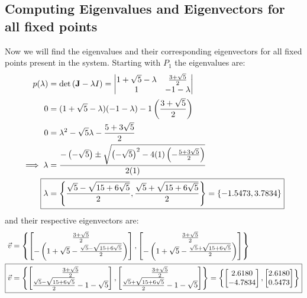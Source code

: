 \subsection{Computing Eigenvalues and Eigenvectors for all fixed points}\label{subsec:computing-eigenvalues-and-eigenvectors-for-all-fixed-points}
Now we will find the eigenvalues and their corresponding eigenvectors for all fixed points present in the system. Starting with $P_1$ the eigenvalues are:
\begin{align*}
    p(\lambda) &= \det\left(\textbf{J}-\lambda I\right) = \begin{vmatrix}
        1+\sqrt{5}-\lambda & \frac{3+\sqrt{5}}{2}\\
        1 & -1-\lambda
    \end{vmatrix}\\
    0 &= (1+\sqrt{5}-\lambda)(-1-\lambda)-1\left(\frac{3+\sqrt{5}}{2}\right)\\
    0 &= \lambda^2-\sqrt{5}\lambda - \frac{5+3\sqrt{5}}{2}\\
    \implies \lambda &= \frac{-\left(-\sqrt{5}\right) \pm \sqrt{\left(-\sqrt{5}\right)^2-4(1)\left(-\frac{5+3\sqrt{5}}{2}\right)}}{2(1)}\\
    \Aboxed{\lambda &= \left\{\frac{\sqrt{5} - \sqrt{15+6\sqrt{5}}}{2}, \frac{\sqrt{5} + \sqrt{15+6\sqrt{5}}}{2}\right\} = \{-1.5473, 3.7834\}}
\end{align*}
and their respective eigenvectors are:
\begin{align*}
    \vec{v} &= \left\{\begin{bmatrix}
        \frac{3+\sqrt{5}}{2}\\
        -\left(1+\sqrt{5}-\frac{\sqrt{5} - \sqrt{15+6\sqrt{5}}}{2}\right)
    \end{bmatrix}, \begin{bmatrix}
        \frac{3+\sqrt{5}}{2}\\
        -\left(1+\sqrt{5}-\frac{\sqrt{5} + \sqrt{15+6\sqrt{5}}}{2}\right)
    \end{bmatrix}\right\}\\
    \Aboxed{\vec{v} &= \left\{\begin{bmatrix}
        \frac{3+\sqrt{5}}{2}\\
        \frac{\sqrt{5} - \sqrt{15+6\sqrt{5}}}{2}-1-\sqrt{5}
    \end{bmatrix}, \begin{bmatrix}
        \frac{3+\sqrt{5}}{2}\\
        \frac{\sqrt{5} + \sqrt{15+6\sqrt{5}}}{2}-1-\sqrt{5}
    \end{bmatrix}\right\} = \left\{\begin{bmatrix}
        2.6180\\
        -4.7834
    \end{bmatrix}, \begin{bmatrix}
        2.6180\\
        0.5473
    \end{bmatrix}\right\}}
\end{align*}
